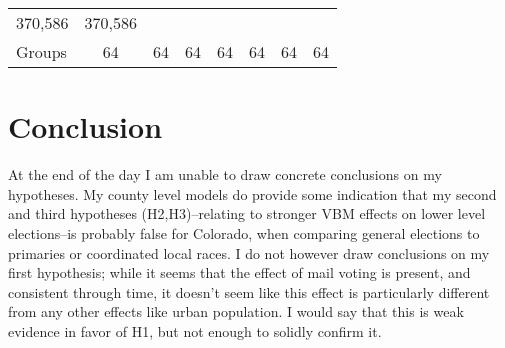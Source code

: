 \documentclass[12pt,twoside]{reedthesis}
\begin{document}
\begin{longtable}[]{@{}lccccccc@{}}
\begin{minipage}[t]{0.10\columnwidth}
  370,586\strut
  \end{minipage} & \begin{minipage}[t]{0.10\columnwidth}\centering\strut
  370,586\strut
  \end{minipage}\tabularnewline
  \begin{minipage}[t]{0.11\columnwidth}\raggedright\strut
  Groups\strut
  \end{minipage} & \begin{minipage}[t]{0.08\columnwidth}\centering\strut
  64\strut
  \end{minipage} & \begin{minipage}[t]{0.10\columnwidth}\centering\strut
  64\strut
  \end{minipage} & \begin{minipage}[t]{0.10\columnwidth}\centering\strut
  64\strut
  \end{minipage} & \begin{minipage}[t]{0.10\columnwidth}\centering\strut
  64\strut
  \end{minipage} & \begin{minipage}[t]{0.10\columnwidth}\centering\strut
  64\strut
  \end{minipage} & \begin{minipage}[t]{0.10\columnwidth}\centering\strut
  64\strut
  \end{minipage} & \begin{minipage}[t]{0.10\columnwidth}\centering\strut
  64\strut
  \end{minipage}\tabularnewline
  \bottomrule
  \end{longtable}
  
  \chapter*{Conclusion}\label{conclusion}
  
  \setcounter{chapter}{5} \setcounter{section}{0}
  
  At the end of the day I am unable to draw concrete conclusions on my
  hypotheses. My county level models do provide some indication that my
  second and third hypotheses (H2,H3)--relating to stronger VBM effects on
  lower level elections--is probably false for Colorado, when comparing
  general elections to primaries or coordinated local races. I do not
  however draw conclusions on my first hypothesis; while it seems that the
  effect of mail voting is present, and consistent through time, it
  doesn't seem like this effect is particularly different from any other
  effects like urban population. I would say that this is weak evidence in
  favor of H1, but not enough to solidly confirm it.
  
\end{document}
